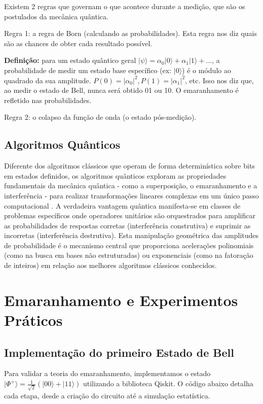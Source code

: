 \documentclass[12pt, a4paper]{article}
\newcommand{\ket}[1]{\lvert #1 \rangle}
\begin{document}
Existem 2 regras que governam o que acontece durante a medição, que são os postulados da mecânica quântica.

Regra 1: a regra de Born (calculando as probabilidades). Esta regra nos diz quais são as chances de obter cada resultado possível. 

\textbf{Definição:} para um estado quântico geral $\ket{\psi} = \alpha_0\ket{0}+\alpha_1\ket{1}+...$, a probabilidade de medir um estado base específico (ex: $\ket{0}$) é o módulo ao quadrado da sua amplitude. $P(0) = |\alpha_0|^2, P(1) = |\alpha_1|^2$, etc. Isso nos diz que, ao medir o estado de Bell, nunca será obtido 01 ou 10. O emaranhamento é refletido nas probabilidades.

Regra 2: o colapso da função de onda (o estado pós-medição).

\subsection{Algoritmos Quânticos}

Diferente dos algoritmos clássicos que operam de forma determinística sobre bits em estados definidos, os algoritmos quânticos exploram as propriedades fundamentais da mecânica quântica - como a superposição, o emaranhamento e a interferência - para realizar transformações lineares complexas em um único passo computacional \cite{abhijith2022quantum}. A verdadeira vantagem quântica manifesta-se em classes de problemas específicos onde operadores unitários são orquestrados para amplificar as probabilidades de respostas corretas (interferência construtiva) e suprimir as incorretas (interferência destrutiva). Esta manipulação geométrica das amplitudes de probabilidade é o mecanismo central que proporciona acelerações polinomiais (como na busca em bases não estruturadas) ou exponenciais (como na fatoração de inteiros) em relação aos melhores algoritmos clássicos conhecidos.

\section{Emaranhamento e Experimentos Práticos}

\subsection{Implementação do primeiro Estado de Bell}

Para validar a teoria do emaranhamento, implementamos o estado $\ket{\Phi^+} = \frac{1}{\sqrt{2}}(\ket{00} + \ket{11})$ utilizando a biblioteca Qiskit. O código abaixo detalha cada etapa, desde a criação do circuito até a simulação estatística.
\end{document}
